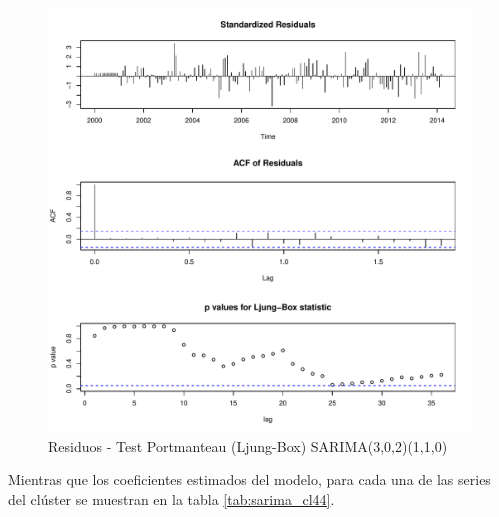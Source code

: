 \documentclass[12pt,oneside]{book}\usepackage[]{graphicx}\usepackage[]{color}
\makeatletter
\def\maxwidth{ %
  \ifdim\Gin@nat@width>\linewidth
    \linewidth
  \else
    \Gin@nat@width
  \fi
}
\newenvironment{knitrout}{}{} %
\theoremstyle{definition} %
\makeatother
\begin{document}
\begin{knitrout}
\color{fgcolor}\begin{figure}[h]

{\centering \includegraphics[width=\maxwidth]{figure/unnamed-chunk-93-1} 

}

\caption[Residuos - Test Portmanteau (Ljung-Box) SARIMA(3,0,2)(1,1,0)]{Residuos - Test Portmanteau (Ljung-Box) SARIMA(3,0,2)(1,1,0)}\label{fig:unnamed-chunk-93}
\end{figure}


\end{knitrout}


Mientras que los coeficientes estimados del modelo, para cada una de las series del clúster se muestran en la tabla \ref{tab:sarima_cl44}.
\end{document}
